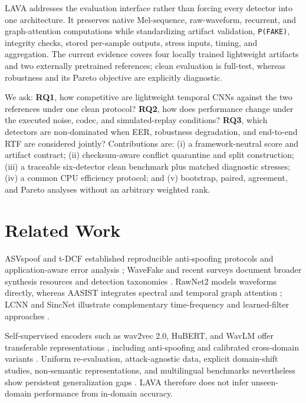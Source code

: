 \documentclass[10pt,journal,onecolumn,a4paper]{IEEEtran}
\begin{document}
LAVA addresses the evaluation interface rather than forcing every detector into one architecture. It preserves native Mel-sequence, raw-waveform, recurrent, and graph-attention computations while standardizing artifact validation, \texttt{P(FAKE)}, integrity checks, stored per-sample outputs, stress inputs, timing, and aggregation. The current evidence covers four locally trained lightweight artifacts and two externally pretrained references; clean evaluation is full-test, whereas robustness and its Pareto objective are explicitly diagnostic.

We ask: \textbf{RQ1}, how competitive are lightweight temporal CNNs against the two references under one clean protocol? \textbf{RQ2}, how does performance change under the executed noise, codec, and simulated-replay conditions? \textbf{RQ3}, which detectors are non-dominated when EER, robustness degradation, and end-to-end RTF are considered jointly? Contributions are: (i) a framework-neutral score and artifact contract; (ii) checksum-aware conflict quarantine and split construction; (iii) a traceable six-detector clean benchmark plus matched diagnostic stresses; (iv) a common CPU efficiency protocol; and (v) bootstrap, paired, agreement, and Pareto analyses without an arbitrary weighted rank.

\section{Related Work}
ASVspoof and t-DCF established reproducible anti-spoofing protocols and application-aware error analysis \cite{wu2015asvspoof,kinnunen2017asvspoof,todisco2019asvspoof,yamagishi2021asvspoof,kinnunen2018tdcf}; WaveFake and recent surveys document broader synthesis resources and detection taxonomies \cite{frank2021wavefake,yi2023survey,li2024survey}. RawNet2 models waveforms directly, whereas AASIST integrates spectral and temporal graph attention \cite{tak2021rawnet2,jung2022aasist,velickovic2018gat}; LCNN and SincNet illustrate complementary time-frequency and learned-filter approaches \cite{wu2020lcnn,ravanelli2018sincnet}.

Self-supervised encoders such as wav2vec 2.0, HuBERT, and WavLM offer transferable representations \cite{baevski2020wav2vec,hsu2021hubert,chen2022wavlm}, including anti-spoofing and calibrated cross-domain variants \cite{tak2022wav2vec,pascu2024calibrated}. Uniform re-evaluation, attack-agnostic data, explicit domain-shift studies, non-semantic representations, and multilingual benchmarks nevertheless show persistent generalization gaps \cite{muller2022generalize,kawa2022attack,muller2024harder,li2024crossdomain,das2025nonsemantic,ciobanu2026xmad}. LAVA therefore does not infer unseen-domain performance from in-domain accuracy.
\end{document}

